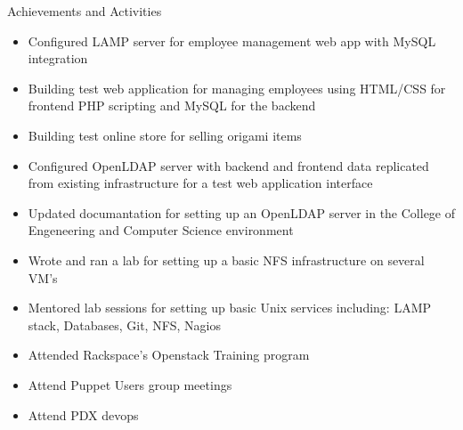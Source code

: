 \documentclass[11pt,oneside]{article}
\newenvironment{ressection}[1]{
	\vspace{4pt}
	{\fontfamily{phv}\selectfont\Large#1}
	\begin{itemize}
	\vspace{3pt}
}{
	\end{itemize}
}
\newcommand{\resitem}[1]{
	\vspace{-4pt}
	\item \begin{flushleft} #1 \end{flushleft}
}
\begin{document}
\begin{ressection}{Achievements and Activities}
    \resitem{Configured LAMP server for employee management web app with MySQL integration}
    \resitem{Building test web application for managing employees using HTML/CSS for frontend PHP scripting and MySQL for the backend}
    \resitem{Building test online store for selling origami items}
    \resitem{Configured OpenLDAP server with backend and frontend data replicated from existing infrastructure for a test web application interface}
    \resitem{Updated documantation for setting up an OpenLDAP server in the College of Engeneering and Computer Science environment}
    \resitem{Wrote and ran a lab for setting up a basic NFS infrastructure on several VM's}
    \resitem{Mentored lab sessions for setting up basic Unix services including: LAMP stack, Databases, Git, NFS, Nagios}
    \resitem{Attended Rackspace's Openstack Training program}
    \resitem{Attend Puppet Users group meetings}
    \resitem{Attend PDX devops}
\end{ressection}
\end{document}
